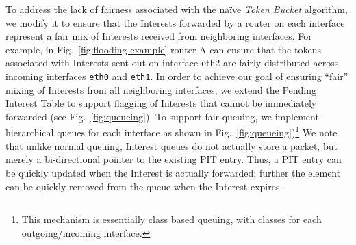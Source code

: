 

To address the lack of fairness associated with the na\"ive {\it Token Bucket} algorithm, we modify it to ensure that the Interests forwarded by a router on each interface represent a fair mix of Interests received from neighboring interfaces. For example, in Fig.~\ref{fig:flooding example} router A can ensure that the tokens associated with Interests sent out on interface {\texttt eth2}  are fairly distributed across incoming interfaces \texttt{eth0} and \texttt{eth1}. 
In order to achieve our goal of ensuring ``fair'' mixing of Interests from all neighboring interfaces, 
we extend the Pending Interest Table to support flagging of Interests that cannot be immediately forwarded (see Fig.~\ref{fig:queueing}). To support fair queuing, we implement hierarchical queues for each interface as shown in Fig.~\ref{fig:queueing})\footnote{This mechanism is essentially class based queuing, with classes for each outgoing/incoming interface.} 
We note that unlike normal queuing, Interest queues do not actually store a packet, but merely a bi-directional pointer to the existing PIT entry.
Thus, a PIT entry can be quickly updated when the Interest is actually forwarded; further the element can be quickly removed from the queue when the Interest expires.


